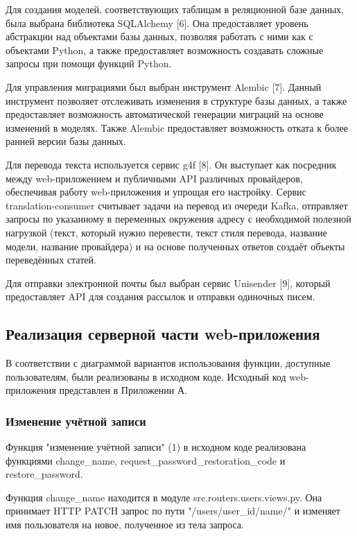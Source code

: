 \documentclass[14pt]{extarticle}
\begin{document}
Для создания моделей, соответствующих таблицам в реляционной базе данных, была выбрана библиотека SQLAlchemy [6]. Она предоставляет уровень абстракции над объектами базы данных, позволяя работать с ними как с объектами Python, а также предоставляет возможность создавать сложные запросы при помощи функций Python.

Для управления миграциями был выбран инструмент Alembic [7]. Данный инструмент позволяет отслеживать изменения в структуре базы данных, а также предоставляет возможность автоматической генерации миграций на основе изменений в моделях. Также Alembic предоставляет возможность отката к более ранней версии базы данных.

Для перевода текста используется сервис g4f [8]. Он выступает как посредник между web-приложением и публичными API различных провайдеров, обеспечивая работу web-приложения и упрощая его настройку. Сервис translation-consumer считывает задачи на перевод из очереди Kafka, отправляет запросы по указанному в переменных окружения адресу с необходимой полезной нагрузкой (текст, который нужно перевести, текст стиля перевода, название модели, название провайдера) и на основе полученных ответов создаёт объекты переведённых статей. 

Для отправки электронной почты был выбран сервис Unisender [9], который предоставляет API для создания рассылок и отправки одиночных писем.

\subsection{Реализация серверной части web-приложения}

В соответствии с диаграммой вариантов использования функции, доступные пользователям, были реализованы в исходном коде. Исходный код web-приложения представлен в Приложении А.

\subsubsection{Изменение учётной записи}

Функция "изменение учётной записи" (1) в исходном коде реализована функциями change\_name, request\_password\_restoration\_code и restore\_password.

Функция change\_name находится в модуле src.routers.users.views.py. Она принимает HTTP PATCH запрос по пути "/users/{user\_id}/name/" и изменяет имя пользователя на новое, полученное из тела запроса.
\end{document}
